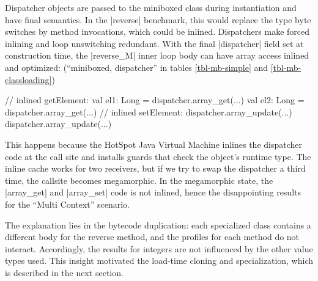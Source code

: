Dispatcher objects are passed to the miniboxed class during instantiation and have final semantics. In the |reverse| benchmark, this would replace the type byte switches by method invocations, which could be inlined. Dispatchers make forced inlining and loop unswitching redundant. With the final |dispatcher| field set at construction time, the |reverse_M| inner loop body can have array access inlined and optimized: (``miniboxed,  dispatcher'' in tables \ref{tbl-mb-simple} and \ref{tbl-mb-classloading})

\begin{lstlisting-nobreak}
 // inlined getElement:
 val el1: Long = dispatcher.array_get(...)
 val el2: Long = dispatcher.array_get(...)
 // inlined setElement:
 dispatcher.array_update(...)
 dispatcher.array_update(...)
\end{lstlisting-nobreak}

 This happens because the HotSpot Java Virtual Machine inlines the dispatcher code at the call site and installs guards that check the object's runtime type. The inline cache works for two receivers, but if we try to swap the dispatcher a third time, the callsite becomes megamorphic. In the megamorphic state, the |array_get| and |array_set| code is not inlined, hence the disappointing results for the ``Multi Context'' scenario.  

 The explanation lies in the bytecode duplication: each specialized class contains a different body for the reverse method, and the profiles for each method do not interact. Accordingly, the results for integers are not influenced by the other value types used. This insight motivated the load-time cloning and specialization, which is described in the next section.